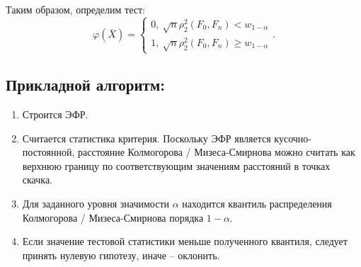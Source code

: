Таким образом, определим тест:
\[
  \varphi(\overline{X}) = \begin{cases}
    0,~ \sqrt{n} \rho_{2}^{2}(F_0, F_n) < w_{1 - \alpha}\\
    1,~ \sqrt{n} \rho_{2}^{2}(F_0, F_n) \geqslant w_{1 - \alpha}
  \end{cases}
.\]

\pagebreak

\subsection{Прикладной алгоритм:}
\begin{enumerate}
  \item Строится ЭФР.
  \item Считается статистика критерия. Поскольку ЭФР является
  кусочно-постоянной, расстояние Колмогорова / Мизеса-Смирнова можно считать как
  верхнюю границу по соответствующим значениям расстояний в точках скачка.
  \item Для заданного уровня значимости $\alpha$ находится квантиль
  распределения Колмогорова / Мизеса-Смирнова порядка $1 - \alpha$.
  \item Если значение тестовой статистики меньше полученного квантиля,
  следует принять нулевую гипотезу, иначе -- оклонить.
\end{enumerate}
